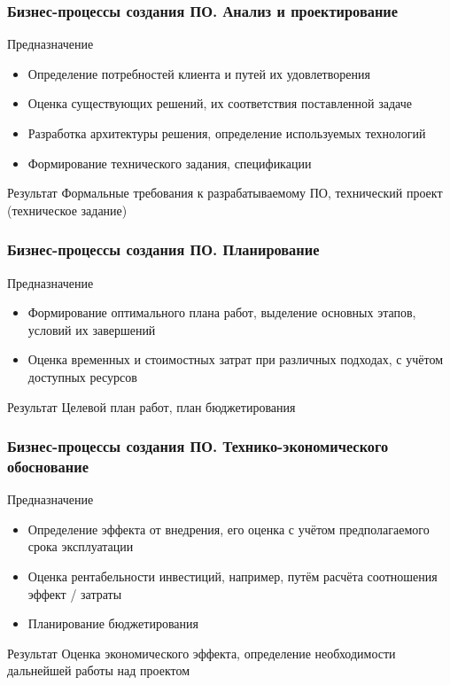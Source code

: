 \documentclass{../industrial-development}
\begin{document}
\begin{frame} \frametitle{Бизнес-процессы создания ПО. Анализ и проектирование}
	\begin{block}{Предназначение}
		\begin{itemize}
			\item Определение потребностей клиента и путей их удовлетворения
			\item Оценка существующих решений, их соответствия поставленной задаче
			\item Разработка архитектуры решения, определение используемых технологий
			\item Формирование технического задания, спецификации
		\end{itemize}
	\end{block}
	\begin{block}{Результат}
		Формальные требования к разрабатываемому ПО, технический проект (техническое задание)
	\end{block}
\end{frame}
\lecturenotes


\begin{frame} \frametitle{Бизнес-процессы создания ПО. Планирование}
	\begin{block}{Предназначение}
		\begin{itemize}
			\item Формирование оптимального плана работ, выделение основных этапов, условий их завершений
			\item Оценка временных и стоимостных затрат при различных подходах, с учётом доступных ресурсов
		\end{itemize}
	\end{block}
	\begin{block}{Результат}
		Целевой план работ, план бюджетирования
	\end{block}
\end{frame}
\lecturenotes


\begin{frame} \frametitle{Бизнес-процессы создания ПО. Технико-экономического обоснование}
	\begin{block}{Предназначение}
		\begin{itemize}
			\item Определение эффекта от внедрения, его оценка с учётом предполагаемого срока эксплуатации
			\item Оценка рентабельности инвестиций, например, путём расчёта соотношения эффект / затраты
			\item Планирование бюджетирования
		\end{itemize}
	\end{block}
	\begin{block}{Результат}
		Оценка экономического эффекта, определение необходимости дальнейшей работы над проектом
	\end{block}
\end{frame}
\lecturenotes
\end{document}
